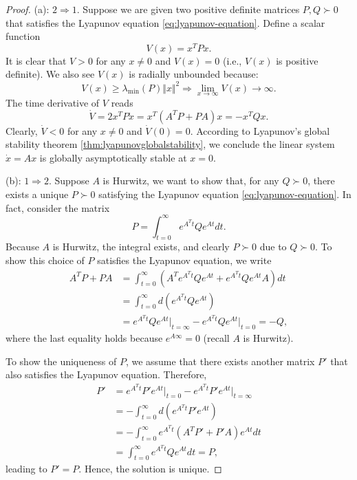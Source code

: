 \documentclass[
]{book}
\theoremstyle{definition}
\theoremstyle{definition}
\theoremstyle{definition}
\theoremstyle{definition}
\theoremstyle{remark}
\begin{document}
\begin{proof}
(a): \(2 \Rightarrow 1\). Suppose we are given two positive definite matrices \(P, Q \succ 0\) that satisfies the Lyapunov equation \eqref{eq:lyapunov-equation}. Define a scalar function
\[
V(x) = x^T P x.
\]
It is clear that \(V > 0\) for any \(x \neq 0\) and \(V(x) = 0\) (i.e., \(V(x)\) is positive definite). We also see \(V(x)\) is radially unbounded because:
\[
V(x) \geq \lambda_{\min}(P) \Vert x \Vert^2 \Rightarrow \lim_{x \rightarrow \infty} V(x) \rightarrow \infty.
\]
The time derivative of \(V\) reads
\[
\dot{V} = 2 x^T P \dot{x} = x^T (A^T P + P A) x = - x^T Q x. 
\]
Clearly, \(\dot{V} < 0\) for any \(x \neq 0\) and \(\dot{V}(0) = 0\). According to Lyapunov's global stability theorem \ref{thm:lyapunovglobalstability}, we conclude the linear system \(\dot{x} = Ax\) is globally asymptotically stable at \(x = 0\).

(b): \(1 \Rightarrow 2\). Suppose \(A\) is Hurwitz, we want to show that, for any \(Q \succ 0\), there exists a unique \(P \succ 0\) satisfying the Lyapunov equation \eqref{eq:lyapunov-equation}. In fact, consider the matrix
\[
P = \int_{t=0}^{\infty} e^{A^T t} Q e^{At} dt.
\]
Because \(A\) is Hurwitz, the integral exists, and clearly \(P \succ 0\) due to \(Q \succ 0\). To show this choice of \(P\) satisfies the Lyapunov equation, we write
\begin{align}
A^T P + P A &= \int_{t=0}^{\infty} \left( A^T e^{A^T t} Q e^{At} + e^{A^T t} Q e^{At} A  \right) dt \\
&=\int_{t=0}^{\infty} d \left( e^{A^T t} Q e^{At} \right) \\ 
& = e^{A^T t} Q e^{At}\vert_{t = \infty} - e^{A^T t} Q e^{At}\vert_{t = 0} = - Q,
\end{align}
where the last equality holds because \(e^{A \infty} = 0\) (recall \(A\) is Hurwitz).

To show the uniqueness of \(P\), we assume that there exists another matrix \(P'\) that also satisfies the Lyapunov equation. Therefore,
\begin{align}
P' &= e^{A^T t} P' e^{At} \vert_{t=0} - e^{A^T t} P' e^{At} \vert_{t=\infty} \\
 &= - \int_{t=0}^{\infty} d \left( e^{A^T t} P' e^{At} \right) \\
 &= - \int_{t=0}^{\infty} e^{A^T t} \left( A^T P' + P' A \right) e^{At} dt \\
 & = \int_{t=0}^{\infty} e^{A^T t} Q e^{At} dt = P,
\end{align}
leading to \(P' = P\). Hence, the solution is unique.
\end{proof}
\end{document}
